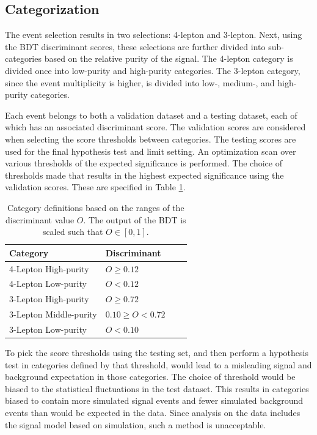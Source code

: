 \subsection{Categorization}

The event selection results in two selections: 4-lepton and 3-lepton.
Next, using the BDT discriminant scores, these selections are further divided into sub-categories based on the relative purity of the signal.
The 4-lepton category is divided once into low-purity and high-purity categories.
The 3-lepton category, since the event multiplicity is higher, is divided into low-, medium-, and high-purity categories.

Each event belongs to both a validation dataset and a testing dataset, each of which has an associated discriminant score.
The validation scores are considered when selecting the score thresholds between categories.
The testing scores are used for the final hypothesis test and limit setting.
An optimization scan over various thresholds of the expected significance is performed.
The choice of thresholds made that results in the highest expected significance using the validation scores.
These are specified in Table \ref{tab:hmmBdtCuts}.

\begin{table}[htp]
\begin{center}
\begin{tabular}{l l l l}
\toprule
Category & Discriminant \\
\midrule
4-Lepton High-purity & $O\ge0.12$ \\
4-Lepton Low-purity & $O<0.12$ \\
3-Lepton High-purity & $O\ge0.72$ \\
3-Lepton Middle-purity & $0.10\ge O<0.72$ \\
3-Lepton Low-purity & $O<0.10$ \\
\bottomrule
\end{tabular}
\caption{Category definitions based on the ranges of the discriminant value $O$. The output of the BDT is scaled such that $O\in[0,1]$.}
\label{tab:hmmBdtCuts}
\end{center}
\end{table}

To pick the score thresholds using the testing set, and then perform a hypothesis test in categories defined by that threshold, would lead to a misleading signal and background expectation in those categories.
The choice of threshold would be biased to the statistical fluctuations in the test dataset.
This results in categories biased to contain more simulated signal events and fewer simulated background events than would be expected in the data.
Since analysis on the data includes the signal model based on simulation, such a method is unacceptable.

